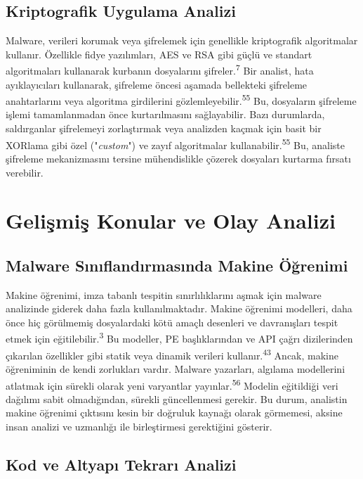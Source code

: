 \subsection{Kriptografik Uygulama Analizi}

Malware, verileri korumak veya şifrelemek için genellikle kriptografik algoritmalar kullanır. Özellikle fidye yazılımları, AES ve RSA gibi güçlü ve standart algoritmaları kullanarak kurbanın dosyalarını şifreler.\textsuperscript{7} Bir analist, hata ayıklayıcıları kullanarak, şifreleme öncesi aşamada bellekteki şifreleme anahtarlarını veya algoritma girdilerini gözlemleyebilir.\textsuperscript{55} Bu, dosyaların şifreleme işlemi tamamlanmadan önce kurtarılmasını sağlayabilir. Bazı durumlarda, saldırganlar şifrelemeyi zorlaştırmak veya analizden kaçmak için basit bir XORlama gibi özel ("\textit{custom}") ve zayıf algoritmalar kullanabilir.\textsuperscript{55} Bu, analiste şifreleme mekanizmasını tersine mühendislikle çözerek dosyaları kurtarma fırsatı verebilir.

\section{Gelişmiş Konular ve Olay Analizi}

\subsection{Malware Sınıflandırmasında Makine Öğrenimi}

Makine öğrenimi, imza tabanlı tespitin sınırlılıklarını aşmak için malware analizinde giderek daha fazla kullanılmaktadır. Makine öğrenimi modelleri, daha önce hiç görülmemiş dosyalardaki kötü amaçlı desenleri ve davranışları tespit etmek için eğitilebilir.\textsuperscript{3} Bu modeller, PE başlıklarından ve API çağrı dizilerinden çıkarılan özellikler gibi statik veya dinamik verileri kullanır.\textsuperscript{43} Ancak, makine öğreniminin de kendi zorlukları vardır. Malware yazarları, algılama modellerini atlatmak için sürekli olarak yeni varyantlar yayınlar.\textsuperscript{56} Modelin eğitildiği veri dağılımı sabit olmadığından, sürekli güncellenmesi gerekir. Bu durum, analistin makine öğrenimi çıktısını kesin bir doğruluk kaynağı olarak görmemesi, aksine insan analizi ve uzmanlığı ile birleştirmesi gerektiğini gösterir.

\subsection{Kod ve Altyapı Tekrarı Analizi}

